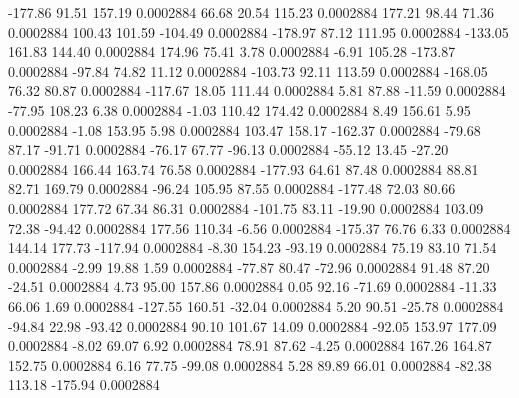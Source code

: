      -177.86       91.51      157.19     0.0002884
       66.68       20.54      115.23     0.0002884
      177.21       98.44       71.36     0.0002884
      100.43      101.59     -104.49     0.0002884
     -178.97       87.12      111.95     0.0002884
     -133.05      161.83      144.40     0.0002884
      174.96       75.41        3.78     0.0002884
       -6.91      105.28     -173.87     0.0002884
      -97.84       74.82       11.12     0.0002884
     -103.73       92.11      113.59     0.0002884
     -168.05       76.32       80.87     0.0002884
     -117.67       18.05      111.44     0.0002884
        5.81       87.88      -11.59     0.0002884
      -77.95      108.23        6.38     0.0002884
       -1.03      110.42      174.42     0.0002884
        8.49      156.61        5.95     0.0002884
       -1.08      153.95        5.98     0.0002884
      103.47      158.17     -162.37     0.0002884
      -79.68       87.17      -91.71     0.0002884
      -76.17       67.77      -96.13     0.0002884
      -55.12       13.45      -27.20     0.0002884
      166.44      163.74       76.58     0.0002884
     -177.93       64.61       87.48     0.0002884
       88.81       82.71      169.79     0.0002884
      -96.24      105.95       87.55     0.0002884
     -177.48       72.03       80.66     0.0002884
      177.72       67.34       86.31     0.0002884
     -101.75       83.11      -19.90     0.0002884
      103.09       72.38      -94.42     0.0002884
      177.56      110.34       -6.56     0.0002884
     -175.37       76.76        6.33     0.0002884
      144.14      177.73     -117.94     0.0002884
       -8.30      154.23      -93.19     0.0002884
       75.19       83.10       71.54     0.0002884
       -2.99       19.88        1.59     0.0002884
      -77.87       80.47      -72.96     0.0002884
       91.48       87.20      -24.51     0.0002884
        4.73       95.00      157.86     0.0002884
        0.05       92.16      -71.69     0.0002884
      -11.33       66.06        1.69     0.0002884
     -127.55      160.51      -32.04     0.0002884
        5.20       90.51      -25.78     0.0002884
      -94.84       22.98      -93.42     0.0002884
       90.10      101.67       14.09     0.0002884
      -92.05      153.97      177.09     0.0002884
       -8.02       69.07        6.92     0.0002884
       78.91       87.62       -4.25     0.0002884
      167.26      164.87      152.75     0.0002884
        6.16       77.75      -99.08     0.0002884
        5.28       89.89       66.01     0.0002884
      -82.38      113.18     -175.94     0.0002884
